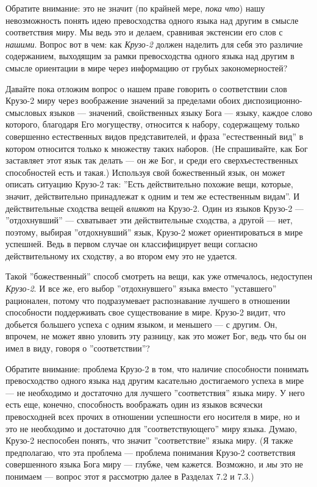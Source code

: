 \documentclass[11pt]{book}
\begin{document}
Обратите внимание: это не значит (по крайней мере, \textit{пока что}) нашу невозможность понять идею превосходства одного языка над другим в смысле соответствия миру. Мы ведь это и делаем, сравнивая экстенсии его слов с \textit{нашими}. Вопрос вот в чем: как \textit{Крузо-2} должен наделить для себя это различие содержанием, выходящим за рамки превосходства одного языка над другим в смысле ориентации в мире через информацию от грубых закономерностей?

Давайте пока отложим вопрос о нашем праве говорить о соответствии слов Крузо-2 миру через воображение значений за пределами обоих диспозиционно-смысловых языков --- значений, свойственных языку Бога --- языку, каждое слово которого, благодаря Его могуществу, относится к набору, содержащему только совершенно естественных видов представителей, и фраза ''естественный вид'' в котором относится только к множеству таких наборов. (Не спрашивайте, как Бог заставляет этот язык так делать --- он же Бог, и среди его сверхъестественных способностей есть и такая.) Используя свой божественный язык, он может описать ситуацию Крузо-2 так: ''Есть действительно похожие вещи, которые, значит, действительно принадлежат к одним и тем же естественным видам''. И действительные сходства вещей \textit{влияют} на Крузо-2. Один из языков Крузо-2 --- ''отдохнувший'' --- схватывает эти действительные сходства, а другой --- нет, поэтому, выбирая ''отдохнувший'' язык, Крузо-2 может ориентироваться в мире успешней. Ведь в первом случае он классифицирует вещи согласно действительному их сходству, а во втором ему это не удается.

Такой ''божественный'' способ смотреть на вещи, как уже отмечалось, недоступен \textit{Крузо-2}. И все же, его выбор ''отдохнувшего'' языка вместо ''уставшего'' рационален, потому что подразумевает распознавание лучшего в отношении способности поддерживать свое существование в мире. Крузо-2 видит, что добьется большего успеха с одним языком, и меньшего --- с другим. Он, впрочем, не может явно уловить эту разницу, как это может Бог, ведь что бы он имел в виду, говоря о ''соответствии''?

Обратите внимание: проблема Крузо-2 в том, что наличие способности понимать превосходство одного языка над другим касательно достигаемого успеха в мире --- не необходимо и достаточно для лучшего ''соответствия'' языка миру. У него есть еще, конечно, способность воображать один из языков всячески превосходней всех прочих в отношении успешности его носителя в мире, но и это не необходимо и достаточно для ''соответствующего'' миру языка. Думаю, Крузо-2 неспособен понять, что значит ''соответствие'' языка миру. (Я также предполагаю, что эта проблема --- проблема понимания Крузо-2 соответствия совершенного языка Бога миру --- глубже, чем кажется. Возможно, и \textit{мы} это не понимаем --- вопрос этот я рассмотрю далее в Разделах 7.2 и 7.3.)
\end{document}
